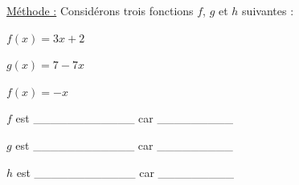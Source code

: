 \documentclass[12pt]{article}
\begin{document}
\underline{Méthode :}
Considérons trois fonctions $f$, $g$ et $h$ suivantes :

\begin{minipage}[t]{.25\textwidth}%
    \vspace{0pt}
    $f(x) = 3x + 2$

    \vspace{15pt}
    $g(x) = 7 - 7x$

    \vspace{15pt}
    $f(x) = -x$
\end{minipage}%
\hfill
\begin{minipage}[t]{.75\textwidth}%
    \vspace{0pt}
    $f$ est \_\_\_\_\_\_\_\_\_\_\_\_ car \_\_\_\_\_\_\_\_\_

    \vspace{15pt}
    $g$ est \_\_\_\_\_\_\_\_\_\_\_\_ car \_\_\_\_\_\_\_\_\_

    \vspace{15pt}
    $h$ est \_\_\_\_\_\_\_\_\_\_\_\_ car \_\_\_\_\_\_\_\_\_
\end{minipage}%
\end{document}
